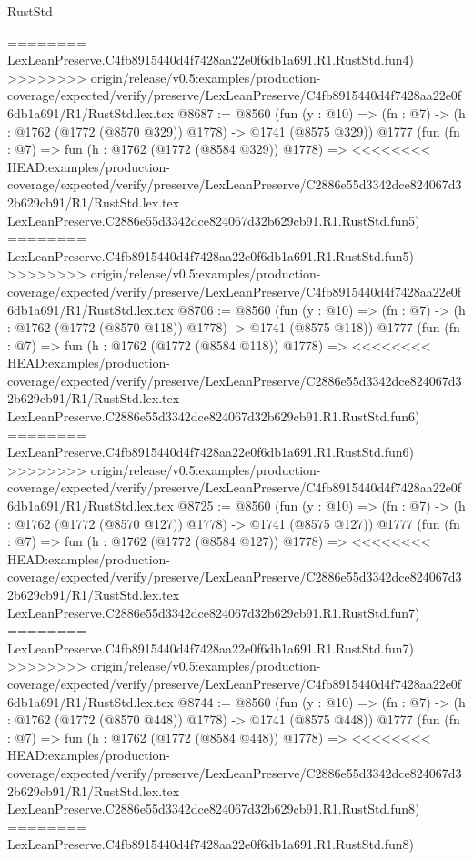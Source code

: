 \begin{lexlean}{RustStd}
\begin{coremodule}
{\begin{coremodule}
{{{{{{{{{{{{{{{========
    LexLeanPreserve.C4fb8915440d4f7428aa22e0f6db1a691.R1.RustStd.fun4)
>>>>>>>> origin/release/v0.5:examples/production-coverage/expected/verify/preserve/LexLeanPreserve/C4fb8915440d4f7428aa22e0f6db1a691/R1/RustStd.lex.tex
@8687 := @8560
    (fun (y : @10) => (fn : @7) -> (h : @1762 (@1772 (@8570 @329)) @1778) -> @1741 (@8575 @329))
    @1777
    (fun (fn : @7) =>
    fun (h : @1762 (@1772 (@8584 @329)) @1778) =>
<<<<<<<< HEAD:examples/production-coverage/expected/verify/preserve/LexLeanPreserve/C2886e55d3342dce824067d32b629cb91/R1/RustStd.lex.tex
    LexLeanPreserve.C2886e55d3342dce824067d32b629cb91.R1.RustStd.fun5)
========
    LexLeanPreserve.C4fb8915440d4f7428aa22e0f6db1a691.R1.RustStd.fun5)
>>>>>>>> origin/release/v0.5:examples/production-coverage/expected/verify/preserve/LexLeanPreserve/C4fb8915440d4f7428aa22e0f6db1a691/R1/RustStd.lex.tex
@8706 := @8560
    (fun (y : @10) => (fn : @7) -> (h : @1762 (@1772 (@8570 @118)) @1778) -> @1741 (@8575 @118))
    @1777
    (fun (fn : @7) =>
    fun (h : @1762 (@1772 (@8584 @118)) @1778) =>
<<<<<<<< HEAD:examples/production-coverage/expected/verify/preserve/LexLeanPreserve/C2886e55d3342dce824067d32b629cb91/R1/RustStd.lex.tex
    LexLeanPreserve.C2886e55d3342dce824067d32b629cb91.R1.RustStd.fun6)
========
    LexLeanPreserve.C4fb8915440d4f7428aa22e0f6db1a691.R1.RustStd.fun6)
>>>>>>>> origin/release/v0.5:examples/production-coverage/expected/verify/preserve/LexLeanPreserve/C4fb8915440d4f7428aa22e0f6db1a691/R1/RustStd.lex.tex
@8725 := @8560
    (fun (y : @10) => (fn : @7) -> (h : @1762 (@1772 (@8570 @127)) @1778) -> @1741 (@8575 @127))
    @1777
    (fun (fn : @7) =>
    fun (h : @1762 (@1772 (@8584 @127)) @1778) =>
<<<<<<<< HEAD:examples/production-coverage/expected/verify/preserve/LexLeanPreserve/C2886e55d3342dce824067d32b629cb91/R1/RustStd.lex.tex
    LexLeanPreserve.C2886e55d3342dce824067d32b629cb91.R1.RustStd.fun7)
========
    LexLeanPreserve.C4fb8915440d4f7428aa22e0f6db1a691.R1.RustStd.fun7)
>>>>>>>> origin/release/v0.5:examples/production-coverage/expected/verify/preserve/LexLeanPreserve/C4fb8915440d4f7428aa22e0f6db1a691/R1/RustStd.lex.tex
@8744 := @8560
    (fun (y : @10) => (fn : @7) -> (h : @1762 (@1772 (@8570 @448)) @1778) -> @1741 (@8575 @448))
    @1777
    (fun (fn : @7) =>
    fun (h : @1762 (@1772 (@8584 @448)) @1778) =>
<<<<<<<< HEAD:examples/production-coverage/expected/verify/preserve/LexLeanPreserve/C2886e55d3342dce824067d32b629cb91/R1/RustStd.lex.tex
    LexLeanPreserve.C2886e55d3342dce824067d32b629cb91.R1.RustStd.fun8)
========
    LexLeanPreserve.C4fb8915440d4f7428aa22e0f6db1a691.R1.RustStd.fun8)
}}}}}}}}}}}}}}}
\end{coremodule}}
\end{coremodule}
\end{lexlean}
